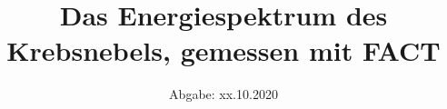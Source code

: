 

\subject{Lehrstuhlversuch im SS2020}
\title{Das Energiespektrum des Krebsnebels, gemessen mit FACT}
\date{%
  Abgabe: xx.10.2020
}


\maketitle
\thispagestyle{empty}
\tableofcontents
\newpage







%


